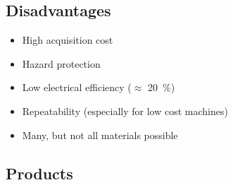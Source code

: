 \documentclass[aspectratio=169]{beamer}
\begin{document}
\subsection{Disadvantages}

\begin{frame}
    \begin{itemize}
        \item High acquisition cost
        \item Hazard protection
        \item Low electrical efficiency ($\approx$ \SI{20}{\percent})
        \item Repeatability (especially for low cost machines)
        \item Many, but not all materials possible
    \end{itemize}
\end{frame}

\subsection{Products}
\end{document}
